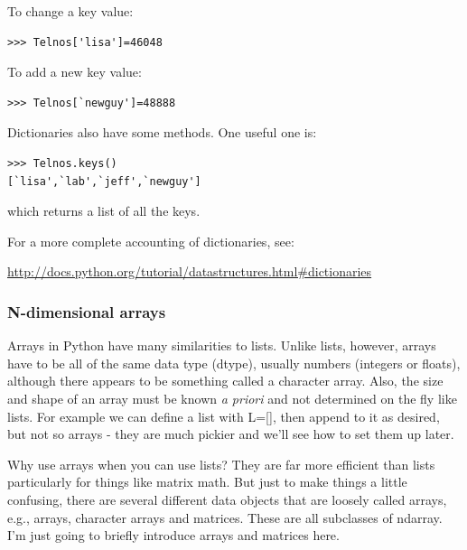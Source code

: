 \documentclass[11pt]{book}
\begin{document}
{{{\noindent
 To change a key value:

{ \color{blue} \begin{verbatim}
>>> Telnos['lisa']=46048
\end{verbatim}}


\noindent
To add a new key value:
{ \color{blue} \begin{verbatim}
>>> Telnos[`newguy']=48888
\end{verbatim}}


\noindent
 Dictionaries also have some methods.
One useful one is:
{ \color{blue} \begin{verbatim}
>>> Telnos.keys()
[`lisa',`lab',`jeff',`newguy']
\end{verbatim}}

\noindent
which returns a list of all the keys.  

For a more complete accounting of dictionaries,  see: 

\url{http://docs.python.org/tutorial/datastructures.html#dictionaries}



\subsubsection{N-dimensional arrays}

Arrays  in Python  have many similarities  to  lists.
Unlike lists, however,  arrays have to be all of the same data type (dtype), usually numbers (integers or floats), although there appears to be something called a character array.  Also, the size and shape of an array must be known {\it a priori} and not determined on the fly like lists. For example we can define a list with {\color{blue}L=[]}, then append to it as desired, but not so arrays - they are much pickier and we'll see how to set them up later.  

Why use arrays when you can use lists?  They are far more efficient than lists particularly for things like matrix math.   But just to make things a little confusing, there are  several different data objects that are loosely called arrays, e.g., arrays, character arrays and matrices.  These are all subclasses of ndarray.  I'm just going to briefly introduce arrays and matrices here.  

}}}
\end{document}
